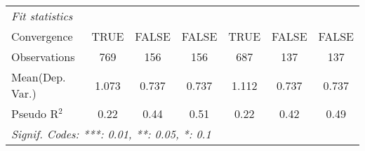 \begin{tabular}{lcccccc}
   \midrule
   \emph{Fit statistics}\\
   Convergence             &TRUE          & FALSE & FALSE & TRUE        & FALSE  & FALSE\\  
   Observations            & 769          & 156   & 156   & 687         & 137    & 137\\  
Mean(Dep. Var.) & 1.073 & 0.737 & 0.737 & 1.112 & 0.737 & 0.737 \\
   Pseudo R$^2$            & 0.22         & 0.44  & 0.51  & 0.22        & 0.42   & 0.49\\  
   \midrule \midrule
   \multicolumn{7}{l}{\emph{Signif. Codes: ***: 0.01, **: 0.05, *: 0.1}}\\
\end{tabular}
\par\endgroup
